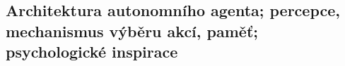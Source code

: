 \subsection{Architektura autonomního agenta; percepce, mechanismus výběru akcí, paměť; psychologické inspirace}